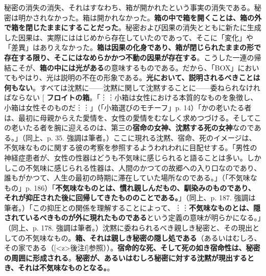 \documentclass[b5j,twoside,twocolumn]{utarticle}
\makeatletter
\def\yakuchu{%
\@ifnextchar[\@xfootnote %
{\stepcounter{yakuchu}%
\protected@xdef\@thefnmark{\theyakuchu}%
\@footnotemark\@footnotetext}}
\makeatother
\begin{document}
秘密の消失の消失、それはすなわち、箱が開かれたという事実の消失である。秘密は明かされなかった。箱は開かれなかった。\textbf{箱の中で箱を開くことは、箱の外で箱を閉じたままにすることだった}。秘密および因果の消失とともに新たに生成した因果は、実際にははじめから存在していたのであって、そこに「変化」や「差異」はありえなかった。\textbf{箱は因果の化身であり、箱が閉じられたままの形で存在する限り、そこにはなめらかかつ不動の因果が存在する}。こうした一連の帰結こそが、\textbf{箱の中には光がある}の意味するものである。だから、「BOX」においてもやはり、光は説明の不在の形象である。\textbf{光において、説明されるべきことは何もない}。すべては沈黙に------沈黙に関して沈黙することに------委ねられなければならない\yakuchu{\textbf{フロイトの箱}。「︙︙小箱は女性における本質的なものを象徴し、小箱は女性そのものだ︙︙」（「小箱選びのモチーフ」p. 14）「かの老いたる者は、最初に母親からえた愛情を、女性の愛情をむなしく求めつづける。そしてこの老いたる者を腕に迎えるのは、第三の\textbf{宿命の女神、沈黙する死の女神}なのである。」（同上、p. 35. 強調は筆者。）ここに現れる沈黙、宿命、死のイメージは、不気味なものに関する彼の考察を参照するようわれわれに目配せする。「男性の神経症患者が、女性の性器はどうも不気味に感じられると語ることは多い。しかしこの不気味に感じられる性器は、人間のかつての故郷への入り口なのであり、誰もがかつて、人生の最初の時期に滞在していた場所なのである。」（「不気味なもの」p. 186）「\textbf{不気味なものとは、慣れ親しんだもの、馴染みのものであり、それが抑圧された後に回帰してきたもののことである。}」（同上、p. 187. 強調は筆者。）「この抑圧との関係を理解することによって、︙︙\textbf{不気味なものとは、隠されているべきものが外に現れたものである}という定義の意味が明らかになる。」（同上、p. 178. 強調は筆者。）沈黙に委ねられるべき親しき秘密と、その現出としての不気味なもの。\textbf{箱、それは親しき秘密の隠し処である}（あるいはむしろ、その家である（[\pbox<z>{後注}f]参照））。\textbf{宿命的な死、そして死の如き宿命性は、秘密の周囲に形成される}。\textbf{秘密が、あるいはむしろ秘密に対する沈黙が現出するとき、それは不気味なものとなる。}}。
\end{document}
